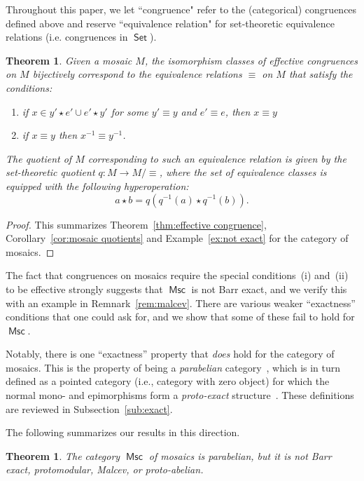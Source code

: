 \documentclass[reqno]{amsart}
\newcommand{\cat}[1]{\ensuremath{\mathsf{#1}}}
\DeclareMathOperator{\Set}{\cat{Set}}
\DeclareMathOperator{\Msc}{\cat{Msc}}
\numberwithin{equation}{section}
\theoremstyle{plain}
\newtheorem{theorem}[equation]{Theorem}
\theoremstyle{definition}
\begin{document}
  

Throughout this paper, we let ``congruence" refer to the (categorical) congruences defined above and reserve ``equivalence relation" for set-theoretic equivalence relations (i.e. congruences in $\Set$).




\begin{theorem}
Given a mosaic $M$, the isomorphism classes of effective congruences on $M$ bijectively correspond to the equivalence relations $\equiv$ on $M$ that satisfy the conditions:
\begin{enumerate}[label=\textnormal{(\roman*)}]
    \item if $x \in y' \star e' \cup e' \star y'$ for some $y' \equiv y$ and $e' \equiv e$, then $x \equiv y$
    \item if $x \equiv y$ then $x^{-1} \equiv y^{-1}$.
\end{enumerate}
The quotient of $M$ corresponding to such an equivalence relation is given by the set-theoretic quotient $q \colon M \to M/\!\!\equiv$, where the set of equivalence classes is equipped with the following hyperoperation:
\[
a \star b = q(q^{-1}(a) \star q^{-1}(b)).
\]  
\end{theorem}

\begin{proof}
    This summarizes Theorem~\ref{thm:effective congruence}, Corollary~\ref{cor:mosaic quotients} and Example~\ref{ex:not exact} for the category of mosaics.
\end{proof}



The fact that congruences on mosaics require the special conditions~(i) and~(ii) to be effective strongly suggests that $\Msc$ is not Barr exact, and we verify this with an example in Remnark~\ref{rem:malcev}. There are various weaker ``exactness'' conditions that one could ask for, and we show that some of these fail to hold for $\Msc$.

Notably, there is one ``exactness'' property that \emph{does} hold for the category of mosaics. This is the property of being a \emph{parabelian} category~\cite{Mozgovoy}, which is in turn defined as a pointed category (i.e., category with zero object) for which the normal mono- and epimorphisms form a \emph{proto-exact} structure~\cite{DK}. These definitions are reviewed in Subsection~\ref{sub:exact}. 

The following summarizes our results in this direction.

\begin{theorem}
The category $\Msc$ of mosaics is parabelian, but it is not Barr exact, protomodular, Malcev, or proto-abelian. 
\end{theorem}
\end{document}
